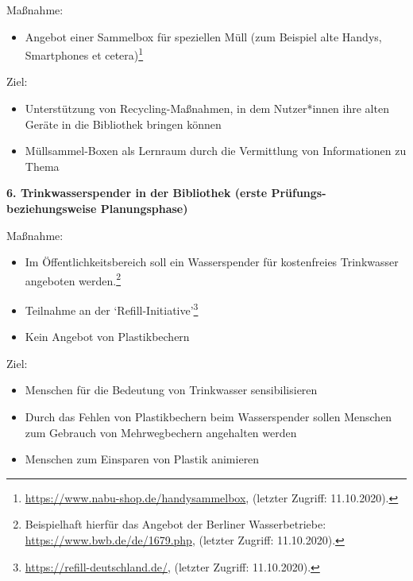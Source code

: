 \documentclass[a4paper,
fontsize=11pt,
oneside,
numbers=noperiodatend,
parskip=half-,
bibliography=totoc,
final
]{scrartcl}
\begin{document}
Maßnahme:

\begin{itemize}[itemsep=-5pt]

\item
  Angebot einer Sammelbox für speziellen Müll (zum Beispiel alte Handys,
  Smartphones et cetera)\footnote{\url{https://www.nabu-shop.de/handysammelbox},
    (letzter Zugriff: 11.10.2020).}
\end{itemize}

Ziel:

\begin{itemize}[itemsep=-5pt]

\item
  Unterstützung von Recycling-Maßnahmen, in dem Nutzer*innen ihre alten
  Geräte in die Bibliothek bringen können
\item
  Müllsammel-Boxen als Lernraum durch die Vermittlung von Informationen
  zu Thema
\end{itemize}

\textbf{6. Trinkwasserspender in der Bibliothek (erste Prüfungs-
beziehungsweise Planungsphase)}

Maßnahme:

\begin{itemize}[itemsep=-5pt]

\item
  Im Öffentlichkeitsbereich soll ein Wasserspender für kostenfreies
  Trinkwasser angeboten werden.\footnote{Beispielhaft hierfür das
    Angebot der Berliner Wasserbetriebe:
    \url{https://www.bwb.de/de/1679.php}, (letzter Zugriff: 11.10.2020).}
\item
  Teilnahme an der \enquote*{Refill-Initiative}\footnote{\url{https://refill-deutschland.de/},
    (letzter Zugriff: 11.10.2020).}
\item
  Kein Angebot von Plastikbechern
\end{itemize}

Ziel:

\begin{itemize}[itemsep=-5pt]

\item
  Menschen für die Bedeutung von Trinkwasser sensibilisieren
\item
  Durch das Fehlen von Plastikbechern beim Wasserspender sollen Menschen
  zum Gebrauch von Mehrwegbechern angehalten werden
\item
  Menschen zum Einsparen von Plastik animieren
\end{itemize}
\end{document}

